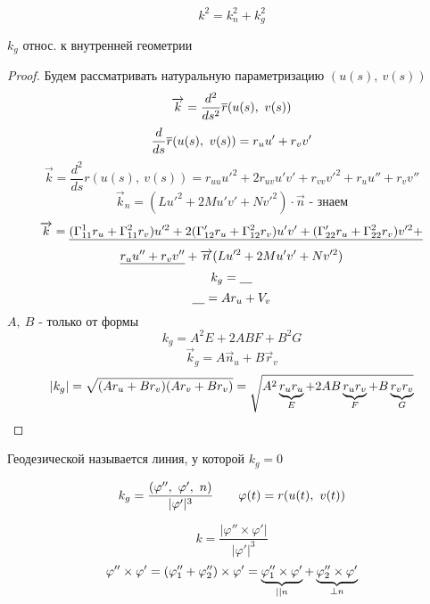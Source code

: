 \documentclass[main]{subfiles}
\begin{document}
    \begin{Property}
        \[k^2 = k_n^2 + k_g^2\]
    \end{Property}

    \begin{theorem}
        $k_g$ относ. к внутренней геометрии
    \end{theorem}

    \begin{proof}
        Будем рассматривать натуральную параметризацию $(u(s),\ v(s))$
        \[\vec{k} = \frac{d^2}{d s^2} \ol{r}(u(s),\ v(s))\]
        \[\frac{d}{ds} \ol{r} (u(s),\ v(s)) = r_u u' + r_v v'\]
        \[\vec{k} = \frac{d^2}{ds} r(u(s),\ v(s)) = r_{uu} u'^2 + 2 r_{uv} u' v' + r_{vv} v'^2 + r_u u'' + r_v v''\]
        \[\vec{k}_n = (L u'^2 + 2 M u' v' + N v'^2) \cdot \vec{n} \text{ - знаем}\]
        \[\vec{k} = \ul{(\Gamma_{11}^1 r_u + \Gamma_{11}^2 r_v) u'^2 + 2 (\Gamma_{12}' r_u + \Gamma_{12}^2 r_v) u' v' + (\Gamma_{22}' r_u + \Gamma_{22}^2 r_v) v'^2 +}\] %
        \[\ul{r_u u'' + r_v v''} + \vec{n}(Lu'^2 + 2Mu'v' + Nv'^2)\]
        \[k_g = \ul{\q}\]
        \[\ul{\q} = A r_u + V_v\]
        $A,\ B$ - только от  формы
        \[k_g = A^2 E + 2ABF + B^2 G\]
        \[\vec{k}_g = A \vec{n}_u + B \vec{r}_v\]
        \[|k_g| = \sqrt{(A r_u + B r_v)(A r_v + B r_v)} = \sqrt{A^2 \ub{E}{r_u r_u} + 2 AB \ub{F}{r_u r_v} + B\ub{G}{r_v r_v}}\]
    \end{proof}

    \begin{definition}
        Геодезической называется линия, у которой $k_g = 0$
    \end{definition}

    \begin{Utv}[формула]
        \[k_g = \frac{(\varphi'',\ \varphi',\ n)}{|\varphi'|^3} \qq \varphi(t) = r(u(t),\ v(t))\]
    \end{Utv}

    \begin{Proof}
        \[k = \frac{|\varphi'' \times \varphi'|}{|\varphi'|^3}\]
        \[\varphi'' \times \varphi' = (\varphi''_1 + \varphi''_2) \times \varphi' = \ub{||n}{\varphi''_1 \times \varphi'} + \ub{\bot n}{\varphi''_2 \times \varphi'}\]
    \end{Proof}
\end{document}

